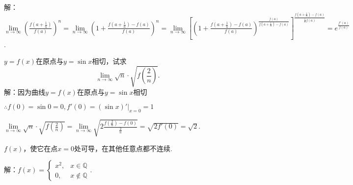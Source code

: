 \documentclass[12pt,UTF8]{ctexart}
\begin{document}
\begin{enumerate}
解：$\lim\limits_{n\rightarrow\infty}(\frac{f(a+\frac1n)}{f(a)})^n=\lim\limits_{n\rightarrow\infty}(1+\frac{f(a+\frac1n)-f(a)}{f(a)})^n=\lim\limits_{n\rightarrow\infty}[(1+\frac{f(a+\frac1n)-f(a)}{f(a)})^{\frac{f(a)}{f(a+\frac1n)-f(a)}}]^{\frac{f(a+\frac1n)-f(a)}{\frac1nf(a)}}=e^{\frac{f'(a)}{f(a)}}$.

$y=f(x)$在原点与$y=\sin x$相切，试求
\[
\lim\limits_{n\rightarrow\infty}\sqrt n\cdot\sqrt{f(\frac2n)}.
\]
解：因为曲线$y=f(x)$在原点与$y=\sin x$相切

$\therefore f(0)=\sin 0=0,f'(0)=(\sin x)'|_{x=0}=1$

$\lim\limits_{n\rightarrow\infty}\sqrt n\cdot\sqrt{f(\frac2n)}=\lim\limits_{n\rightarrow\infty}\sqrt{2\frac{f(\frac2n)-f(0)}{\frac2n}}=\sqrt{2f'(0)}=\sqrt2$.

$f(x)$，使它在点$x=0$处可导，在其他任意点都不连续.

解：$f(x)=\begin{cases}
x^2,&x\in\mathbb Q\\
0,&x\notin\mathbb Q
\end{cases}$.
\end{enumerate}
\end{document}
